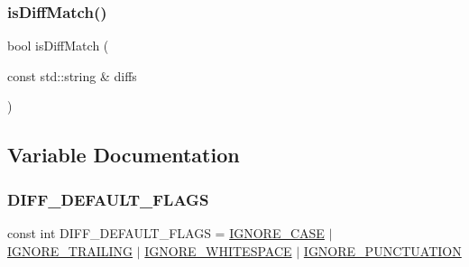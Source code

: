 \mbox{\label{namespacesgl_1_1priv_1_1diff_a02aeebb7bbdd2871ba3d5470721004e5}} 
\subsubsection{\texorpdfstring{is\+Diff\+Match()}{isDiffMatch()}}
{\footnotesize\ttfamily bool is\+Diff\+Match (\begin{DoxyParamCaption}\item[{const std\+::string \&}]{diffs }\end{DoxyParamCaption})}



\subsection{Variable Documentation}
\mbox{\label{namespacesgl_1_1priv_1_1diff_a5044abd56bc89e814e2d953b8e8c0a65}} 
\subsubsection{\texorpdfstring{D\+I\+F\+F\+\_\+\+D\+E\+F\+A\+U\+L\+T\+\_\+\+F\+L\+A\+GS}{DIFF\_DEFAULT\_FLAGS}}
{\footnotesize\ttfamily const int D\+I\+F\+F\+\_\+\+D\+E\+F\+A\+U\+L\+T\+\_\+\+F\+L\+A\+GS = \mbox{\hyperlink{namespacesgl_1_1priv_1_1diff_ab3b1c38517a62ce7edefba7b93b406dda743829c4dd20c98f1a4db5f83106d839}{I\+G\+N\+O\+R\+E\+\_\+\+C\+A\+SE}} $\vert$ \mbox{\hyperlink{namespacesgl_1_1priv_1_1diff_ab3b1c38517a62ce7edefba7b93b406dda4cf05931c8f25fb17d9f490c6bd67d70}{I\+G\+N\+O\+R\+E\+\_\+\+T\+R\+A\+I\+L\+I\+NG}} $\vert$ \mbox{\hyperlink{namespacesgl_1_1priv_1_1diff_ab3b1c38517a62ce7edefba7b93b406ddab94634739aa9d0705e2eb7976a969a20}{I\+G\+N\+O\+R\+E\+\_\+\+W\+H\+I\+T\+E\+S\+P\+A\+CE}} $\vert$ \mbox{\hyperlink{namespacesgl_1_1priv_1_1diff_ab3b1c38517a62ce7edefba7b93b406dda84e6a2f9f288157ed7a207dc744e1d46}{I\+G\+N\+O\+R\+E\+\_\+\+P\+U\+N\+C\+T\+U\+A\+T\+I\+ON}}}

